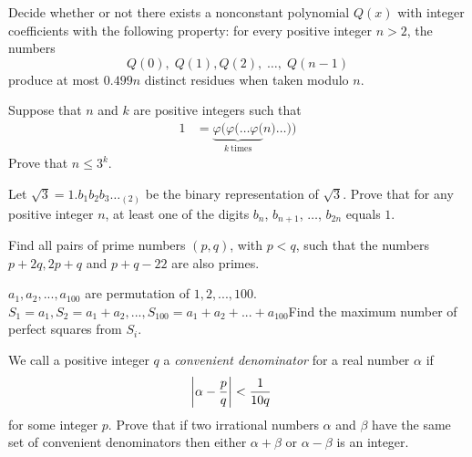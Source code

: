 \begin{problem}
	Decide whether or not there exists a nonconstant polynomial $Q(x)$ with integer coefficients with the following property: for every positive integer $n > 2$, the numbers \[ Q(0), \; Q(1), Q(2), \; \dots, \; Q(n-1) \]produce at most $0.499n$ distinct residues when taken modulo $n$. %
\end{problem}

\begin{problem}
	Suppose that $n$ and $k$ are positive integers such that
		\begin{align*}
			1
				& = \underbrace{\varphi( \varphi( \dots \varphi(}_{k\ \text{times}} n) \dots ))
		\end{align*}
	Prove that $n \le 3^k$. %
\end{problem}

\begin{problem}
	Let $\sqrt 3 = 1.b_1b_2b_3 \dots _{(2)}$ be the binary representation of $\sqrt 3$. Prove that for any positive integer $n$, at least one of the digits $b_n$, $b_{n+1}$, $\dots$, $b_{2n}$ equals $1$. %
\end{problem}

\begin{problem}
	Find all pairs of prime numbers $(p, q)$, with $p <q$, such that the numbers $p + 2q, 2p + q$ and $p + q - 22$ are also primes.
\end{problem}

\begin{problem}
	$a_1,a_2,...,a_{100}$ are permutation of $1,2,...,100$. $S_1=a_1, S_2=a_1+a_2,...,S_{100}=a_1+a_2+...+a_{100}$Find the maximum number of perfect squares from $S_i$. %
\end{problem}

\begin{problem}
	We call a positive integer $q$ a \textit{convenient denominator} for a real number $\alpha$ if
		\begin{align*}
			\left\lvert\alpha - \dfrac{p}{q}\right\rvert
				& <\dfrac{1}{10q}
		\end{align*}
	for some integer $p$. Prove that if two irrational numbers $\alpha$ and
	$\beta$ have the same set of convenient denominators then either $\alpha+\beta$ or $\alpha- \beta$ is an integer. %
\end{problem}
